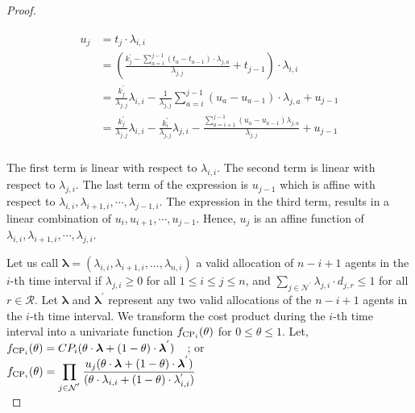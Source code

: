 \documentclass[letterpaper]{article} %
\theoremstyle{definition}
\begin{document}
\begin{proof}
\begin{linenomath}
\begin{align*}
\begin{split}
u_{j} & = t_{j} \cdot \lambda_{i,i} \\
& = \displaystyle \left( \frac{k^{'}_{j} - \displaystyle \sum_{a = i}^{j-1} (t_{a} - t_{a-1}) \cdot \lambda_{j,a}}{\lambda_{j,j}} + t_{j-1} \right) \cdot \lambda_{i,i}\\
& = \displaystyle \frac{k^{'}_{j}}{\lambda_{j,j}} \lambda_{i,i} - \frac{1}{\lambda_{j,j}} \displaystyle \sum_{a = i}^{j-1} (u_{a} - u_{a-1})\cdot \lambda_{j,a} + u_{j-1} \\
& = \displaystyle \frac{k^{'}_{j}}{\lambda_{j,j}} \lambda_{i,i} - \frac{k^{'}_{i}}{\lambda_{j,j}} \lambda_{j, i} - \frac{\displaystyle \sum_{a = i + 1}^{j-1} (u_{a} - u_{a-1}) \lambda_{j,a}}{\lambda_{j,j}}  + u_{j-1} \\
\end{split}
\end{align*}
\end{linenomath}

\noindent The first term is linear with respect to $\lambda_{i,i}$. The second term is linear with respect to $\lambda_{j,i}$. The last term of the expression is $u_{j-1}$ which is affine with respect to $\lambda_{i, i}, \lambda_{i+ 1,i}, \cdots , \lambda_{j-1, i}$. The expression in the third term, results in a linear combination of $u_{i}, u_{i+1}, \cdots, u_{j-1}$. Hence, $u_{j}$ is an affine function of $\lambda_{i,i}, \lambda_{i+1,i}, \cdots ,\lambda_{j,i}$. 

Let us call $\boldsymbol{{\lambda}} = (\lambda_{i,i}, \lambda_{i+1,i}, ... ,\lambda_{n,i})$ a valid allocation of $n - i + 1$ agents in the $i$-th time interval if $\lambda_{j,i} \geq 0$ for all $1 \leq i \leq j \leq n$, and $ \displaystyle \sum_{j \in \mathcal{N}^{'}} \lambda_{j,i} \cdot d_{j,r} \leq 1$ for all $r \in \mathcal{R}$. Let $\boldsymbol{\lambda}$ and $\boldsymbol{\lambda}^{'}$ represent any two valid allocations of the $n - i+1 $ agents in the $i$-th time interval. We transform the cost product during the $i$-th time interval into a univariate function $f_{\textnormal{CP}_{i}}(\theta)$ for $0 \leq \theta \leq 1$. Let,
\\$f_{\textnormal{CP}_{i}}(\theta) = CP_i(\theta \cdot \boldsymbol{\lambda} + (1 - \theta) \cdot \boldsymbol{\lambda}^{'})\quad$; or \\[2 pt]
$f_{\textnormal{CP}_{i}}(\theta) =  \displaystyle \prod_{j \in \mathcal{N}^{'}} \displaystyle \frac{u_{j}(\theta \cdot \boldsymbol{\lambda} + (1 - \theta) \cdot \boldsymbol{\lambda}^{'})}{(\theta \cdot \lambda_{i,i} + (1 - \theta) \cdot \lambda^{'}_{i,i}) }$ \\


\end{proof}
\end{document}
